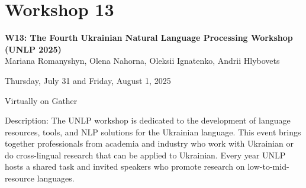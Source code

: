 \clearpage



\section[W13: The Fourth Ukrainian Natural Language Processing Workshop (UNLP 2025)]{Workshop 13}
\label{workshop_13}

\begin{center}
    {\Large \textbf{W13: The Fourth Ukrainian Natural Language Processing Workshop (UNLP 2025)}}\\

    Mariana Romanyshyn, Olena Nahorna, Oleksii Ignatenko, Andrii Hlybovets
    
    Thursday, July 31 and Friday, August 1, 2025
    
    Virtually on Gather

\end{center}

Description: The UNLP workshop is dedicated to the development of language resources, tools, and NLP solutions for the Ukrainian language. This event brings together professionals from academia and industry who work with Ukrainian or do cross-lingual research that can be applied to Ukrainian. Every year UNLP hosts a shared task and invited speakers who promote research on low-to-mid-resource languages.

